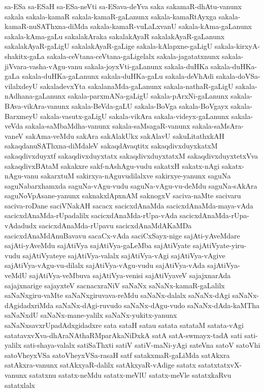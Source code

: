 {sa-ESa
sa-ESaH
sa-ESa-neVti
sa-ESava-deYva
saka
sakamaR-dhAtu-vanunx
sakala
sakala-kamaR
sakala-kamaR-gaLanunx
sakala-kamaRtAyxga
sakala-kamaR-nuSAThxna-diMda
sakala-kamaR-vuLaLxvanU
sakala-kAma-gaLanunx
sakala-kAma-gaLu
sakalakAraka
sakalakAyaR
sakalakAyaR-gaLanunx
sakalakAyaR-gaLigU
sakalakAyaR-gaLige
sakala-kAlapxne-gaLigU
sakala-kirxyA-shakitx-gaLa
sakala-ceVtana-ceVtana-gaLigelalx
sakala-jagatatxnunx
sakala-jiVvara-vasha-vAgu-vanu
sakala-joyxVti-gaLanunx
sakala-duHKa
sakala-duHKa-gaLa
sakala-duHKa-gaLanunx
sakala-duHKa-gaLu
sakala-deVhAdi
sakala-doVSa-vilalxdeyU
sakaladevxYta
sakalanaMda-gaLanunx
sakala-nathaR-gaLigU
sakala-nAdhana-gaLanunx
sakala-parxmANa-gaLigU
sakala-pArxNi-gaLanunx
sakala-BAva-vikAra-vanunx
sakala-BeVda-gaLU
sakala-BoVga
sakala-BoVgayx
sakala-BarxmeyU
sakala-vasutx-gaLigU
sakala-vikAra
sakala-videyx-gaLanunx
sakala-veVda
sakala-saMbaMdha-vanunx
sakala-saMsagaR-vanunx
sakala-saMsAra-vaneV
sakAma-veMdu
sakAra
sakAlakUkx
sakAlavU
sakuLitathxkAH
sakaqdanuSAThxna-diMdaleV
sakaqdAvaqtitx
sakaqdivxduyxkatxM
sakaqdivxduyxtf
sakaqdivxduyxtatx
sakaqdivxduyxtatxM
sakaqdivxduyxtetxVva
sakaqdivxBAtaM
sakakxre
sakf-nAshAgu-vudu
sakatxH
sakatx-nAgi
sakatx-nAgu-vanu
sakarxtuM
sakirxya-nAguvudilalxve
sakirxye-yanunx
saguNa
saguNabarxhamxda
saguNa-vAgu-vudu
saguNa-vAgu-vu-deMdu
saguNa-sAkAra
saguNoVpAsane-yanunx
saknakxlApxnAM
saknogxV
saciva-naMte
sacivaru
saciva-roDane
saciVNakAH
sacacx
sacicxdAnaMda
sacicxdAnaMda-maya-vAda
sacicxdAnaMda-rUpadalilx
sacicxdAnaMda-rUpa-vAda
sacicxdAnaMda-rUpa-vAdadudx
sacicxdAnaMda-rUpavu
sacicxdAnaMdAKaMDa
sacicxdAnaMdAnuBavavu
sacaCx-vAda
saciCxSayx-nige
sajAti-yAveMdare
sajAti-yAveMdu
sajAtiVya
sajAtiVya-gaLeMba
sajAtiVyate
sajAtiVyate-yiru-vudu
sajAtiVyateye
sajAtiVya-valalx
sajAtiVya-vAgi
sajAtiVya-vAgive
sajAtiVya-vAgu-vu-dilalx
sajAtiVya-vAgu-vudu
sajAtiVya-vAda
sajAtiVya-veMdU
sajAtiVya-veMbuva
sajAtiVya-venisi
sajAtiVyaveV
sajajxnarAda
sajajxnarige
sajayxteV
sacnacxraNiV
saNaNx
saNaNx-kamaR-gaLalilx
saNaNxgiru-vaMte
saNaNxgiruvava-reMdu
saNaNx-dalalx
saNaNx-dAgi
saNaNx-dAgidadxriMda
saNaNx-dAgi-ruvudo
saNaNx-dAgu-vudo
saNaNx-dAda-kaMTha
saNaNxdU
saNaNx-mane-yalilx
saNaNx-yukitx-yanunx
saNaNxsavxrUpadAdxgidadxre
sata
sataH
satau
satata
satataM
satata-vAgi
satatavxvXva-dhAraNAthaRMparAkaNiDxkA
satA
satA-swmayx-tadA
sati
sati-yalilx
sati-shaya-valalx
satiSaThxti
satiV
satiV-maNi-yAgi
sateVna
satoV
satoVhi
satoVheyxVSa
satoVheyxVSa-rasaH
satf
satakxmaR-gaLiMda
satAkxra
satAkxra-vanunx
satAkxyaR-dalilx
satAkxyaR-vAdige
satatx
satatxtatxvX-vanunx
satatxnu
satatx-neMdu
satatx-meVlU
satatx-meVle
satatxkaRvu
satatxlalx
}
